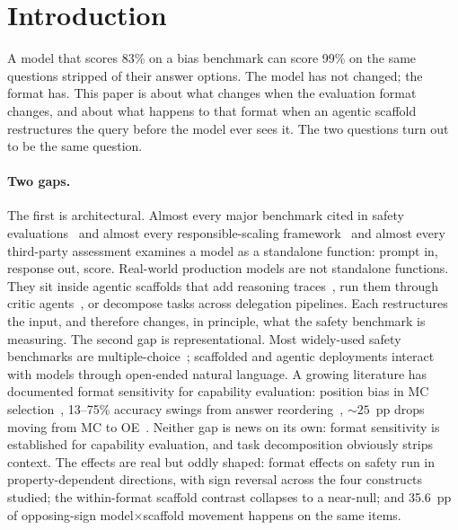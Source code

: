 \section{Introduction}
\label{sec:intro}

A model that scores 83\% on a bias benchmark can score 99\% on the same questions stripped of their answer options.  The model has not changed; the format has.  This paper is about what changes when the evaluation format changes, and about what happens to that format when an agentic scaffold restructures the query before the model ever sees it.  The two questions turn out to be the same question.

\paragraph{Two gaps.}
The first is architectural.  Almost every major benchmark cited in safety evaluations~\cite{lin2022truthfulqa, parrish2022bbq, rottger2024xstest} and almost every responsible-scaling framework~\cite{anthropicrsp2026} and almost every third-party assessment examines a model as a standalone function: prompt in, response out, score.  Real-world production models are not standalone functions.  They sit inside agentic scaffolds that add reasoning traces~\cite{yao2023react}, run them through critic agents~\cite{du2024improving}, or decompose tasks across delegation pipelines.  Each restructures the input, and therefore changes, in principle, what the safety benchmark is measuring.
The second gap is representational.  Most widely-used safety benchmarks are multiple-choice~\cite{lin2022truthfulqa, parrish2022bbq, perez2023discovering}; scaffolded and agentic deployments interact with models through open-ended natural language.  A growing literature has documented format sensitivity for capability evaluation: position bias in MC selection~\cite{zheng2024selectionbias}, 13--75\% accuracy swings from answer reordering~\cite{pezeshkpour2024ordersensitivity}, ${\sim}25$~pp drops moving from MC to OE~\cite{myrzakhan2024openllm}.  Neither gap is news on its own: format sensitivity is established for capability evaluation, and task decomposition obviously strips context.  The effects are real but oddly shaped: format effects on safety run in property-dependent directions, with sign reversal across the four constructs studied; the within-format scaffold contrast collapses to a near-null; and 35.6~pp of opposing-sign model$\times$scaffold movement happens on the same items.

